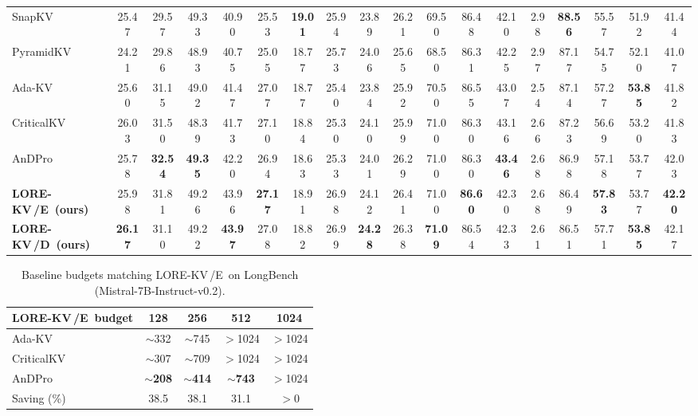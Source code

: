 \documentclass{article} %
\newcommand{\best}[1]{\textcolor{bestblue}{\textbf{#1}}}
\newcommand{\second}[1]{\textcolor{secondorange}{#1}}
\newcommand{\lorekvE}{LORE-KV\,/E}
\newcommand{\lorekvD}{LORE-KV\,/D}
\begin{document}
\begin{table}[t]
{\begin{tabular}{lccccccccccccccccc}
SnapKV 
& 25.47 & 29.57 & \second{49.33} 
& 40.90 & 25.53 & \best{19.01} 
& 25.94 & 23.89 & 26.21 
& 69.50 & 86.48 & 42.10 
& \second{2.98} & \best{88.56} 
& 55.57 & 51.92 
& 41.44 \\

PyramidKV 
& 24.21 & 29.86 & 48.93 
& 40.75 & 25.05 & 18.77 
& 25.73 & 24.06 & 25.65 
& 68.50 & 86.31 & 42.25 
& 2.97 & 87.17 
& 54.75 & 52.10 
& 41.07 \\

Ada-KV 
& 25.60 & 31.15 & 49.02 
& 41.47 & 27.07 & 18.77 
& 25.40 & 23.84 & 25.92 
& 70.50 & \second{86.55} & 43.07 
& 2.54 & 87.14 
& 57.27 & \best{53.85} 
& 41.82 \\

CriticalKV 
& \second{26.03} & 31.50 & 48.39 
& 41.73 & \second{27.10} & 18.84 
& 25.30 & 24.10 & 25.99 
& \second{71.00} & 86.30 & \second{43.16} 
& 2.66 & \second{87.23} 
& 56.69 & 53.20 
& 41.83 \\

AnDPro 
& 25.78 & \best{32.54} & \best{49.35} 
& 42.20 & 26.94 & 18.63 
& 25.33 & 24.01 & 26.29 
& \second{71.00} & 86.30 & \best{43.46} 
& 2.68 & 86.98 
& 57.18 & \second{53.77} 
& 42.03 \\

\textbf{\lorekvE\ (ours)} 
& 25.98 & \second{31.81} & 49.26 
& \second{43.96} & \best{27.17} & \second{18.91} 
& 26.98 & \second{24.12} & \second{26.41} 
& \second{71.00} & \best{86.60} & 42.30 
& 2.68 & 86.49 
& \best{57.83} & \second{53.77} 
& \best{42.20} \\

\textbf{\lorekvD\ (ours)} 
& \best{26.17} & 31.10 & 49.22 
& \best{43.97} & 27.08 & 18.82 
& \second{26.99} & \best{24.28} & 26.38 
& \best{71.09} & 86.54 & 42.33 
& 2.61 & 86.51 
& \second{57.71} & \best{53.85} 
& \second{42.17} \\

\bottomrule
\end{tabular}%
}
\end{table}

\begin{table}
\vspace{-11pt}
\centering
\caption{Baseline budgets matching \lorekvE\ on LongBench (Mistral-7B-Instruct-v0.2).}
\label{tab:budget_equivalence}
\scriptsize
\setlength{\tabcolsep}{3.5pt}
\begin{tabular}{lcccc}
\toprule
\lorekvE\ budget & 128 & 256 & 512 & 1024 \\
\midrule
Ada-KV      & $\sim$332 & $\sim$745 & $>$1024 & $>$1024 \\
CriticalKV  & $\sim$307 & $\sim$709 & $>$1024 & $>$1024 \\
AnDPro      & \best{$\sim$208} & \best{$\sim$414} &
              \best{$\sim$743} & $>$1024 \\
\midrule
Saving (\%) & 38.5 & 38.1 & 31.1 & $>0$ \\
\bottomrule
\end{tabular}
\vspace{-8pt}
\end{table}
\end{document}
